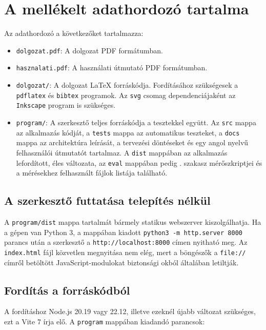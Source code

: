 \pagestyle{empty}

\section*{A mellékelt adathordozó tartalma}

Az adathordozó a következőket tartalmazza:

\begin{itemize}
\item \texttt{dolgozat.pdf}: A dolgozat PDF formátumban.
\item \texttt{hasznalati.pdf}: A használati útmutató PDF formátumban.
\item \texttt{dolgozat/}: A dolgozat LaTeX forráskódja. Fordításához szükségesek a \texttt{pdflatex} és \texttt{bibtex} programok. Az \texttt{svg} csomag dependenciájaként az \texttt{Inkscape} program is szükséges. 
\item \texttt{program/}: A szerkesztő teljes forráskódja a tesztekkel együtt. Az \texttt{src} mappa az alkalmazás kódját, a \texttt{tests} mappa az automatikus teszteket, a \texttt{docs} mappa az architektúra leírását, a tervezési döntéseket és egy angol nyelvű felhasználói útmutatót tartalmaz. A \texttt{dist} mappában az alkalmazás lefordított, éles változata, az \texttt{eval} mappában pedig . szakasz mérőszkriptjei és a mérésekhez felhasznált fájlok listája található.
\end{itemize}

\subsection*{A szerkesztő futtatása telepítés nélkül}

A \texttt{program/dist} mappa tartalmát bármely statikus webszerver kiszolgálhatja. Ha a gépen van Python 3, a mappában kiadott \texttt{python3 -m http.server 8000} parancs után a szerkesztő a \texttt{http://localhost:8000} címen nyitható meg. Az \texttt{index.html} fájl közvetlen megnyitása nem elég, mert a böngészők a \texttt{file://} címről betöltött JavaScript-modulokat biztonsági okból általában letiltják.

\subsection*{Fordítás a forráskódból}

A fordításhoz Node.js 20.19 vagy 22.12, illetve ezeknél újabb változat szükséges, ezt a Vite 7 írja elő. A \texttt{program} mappában kiadandó parancsok:

